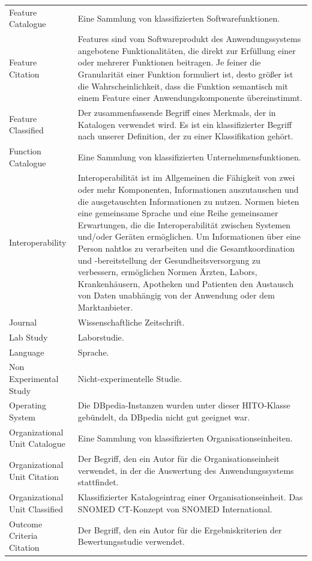 \begin{longtable}[ht]{p{} p{8cm}}
Feature Catalogue & Eine Sammlung von klassifizierten Softwarefunktionen. \\
Feature Citation & Features sind vom Softwareprodukt des Anwendungssystems angebotene Funktionalitäten, die direkt zur Erfüllung einer oder mehrerer Funktionen beitragen. Je feiner die Granularität einer Funktion formuliert ist, desto größer ist die Wahrscheinlichkeit, dass die Funktion semantisch mit einem Feature einer Anwendungskomponente übereinstimmt. \\
Feature Classified & Der zusammenfassende Begriff eines Merkmals, der in Katalogen verwendet wird. Es ist ein klassifizierter Begriff nach unserer Definition, der zu einer Klassifikation gehört.  \\
Function Catalogue & Eine Sammlung von klassifizierten Unternehmensfunktionen. \\
Interoperability & Interoperabilität ist im Allgemeinen die Fähigkeit von zwei oder mehr Komponenten, Informationen auszutauschen und die ausgetauschten Informationen zu nutzen. Normen bieten eine gemeinsame Sprache und eine Reihe gemeinsamer Erwartungen, die die Interoperabilität zwischen Systemen und/oder Geräten ermöglichen. Um Informationen über eine Person nahtlos zu verarbeiten und die Gesamtkoordination und -bereitstellung der Gesundheitsversorgung zu verbessern, ermöglichen Normen Ärzten, Labors, Krankenhäusern, Apotheken und Patienten den Austausch von Daten unabhängig von der Anwendung oder dem Marktanbieter. \\
Journal & Wissenschaftliche Zeitschrift. \\
Lab Study & Laborstudie. \\
Language & Sprache. \\
Non Experimental Study & Nicht-experimentelle Studie. \\
Operating System & Die DBpedia-Instanzen wurden unter dieser HITO-Klasse gebündelt, da DBpedia nicht gut geeignet war. \\
Organizational Unit Catalogue & Eine Sammlung von klassifizierten Organisationseinheiten. \\
Organizational Unit Citation & Der Begriff, den ein Autor für die Organisationseinheit verwendet, in der die Auswertung des Anwendungssystems stattfindet. \\
Organizational Unit Classified & Klassifizierter Katalogeintrag einer Organisationseinheit. Das SNOMED CT-Konzept von SNOMED International. \\
Outcome Criteria Citation & Der Begriff, den ein Autor für die Ergebniskriterien der Bewertungsstudie verwendet. \\

\end{longtable}
